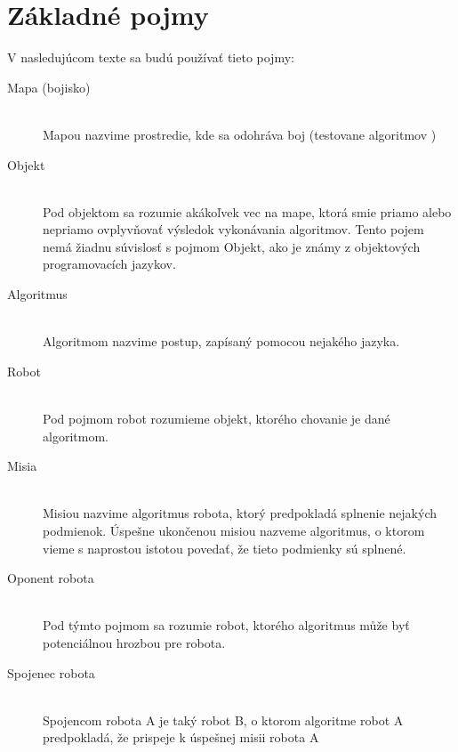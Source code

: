 \section{ Základné pojmy }
V nasledujúcom texte sa budú používať tieto pojmy:
\begin{description}
\item[Mapa (bojisko)]\hfill \\
	Mapou nazvime prostredie, kde sa odohráva boj (testovane algoritmov )
\item[Objekt]\hfill \\
	Pod objektom sa rozumie akákoľvek vec na mape, ktorá smie priamo alebo nepriamo ovplyvňovať výsledok vykonávania algoritmov. Tento pojem nemá žiadnu súvislosť s pojmom Objekt, ako je známy z objektových programovacích jazykov.
\item[Algoritmus]\hfill \\
	Algoritmom nazvime postup, zapísaný pomocou nejakého jazyka. 
\item[Robot]\hfill \\
	Pod pojmom robot rozumieme objekt, ktorého chovanie je dané algoritmom.
\item[Misia]\hfill \\
	Misiou nazvime algoritmus robota, ktorý predpokladá splnenie nejakých podmienok. Úspešne ukončenou misiou nazveme algoritmus, o ktorom vieme s naprostou istotou povedať, že tieto podmienky sú splnené.
\item[Oponent robota]\hfill \\
	Pod týmto pojmom sa rozumie robot, ktorého algoritmus může byť potenciálnou hrozbou pre robota.
\item[Spojenec robota] \hfill \\
	Spojencom robota A je taký robot B, o ktorom algoritme robot A predpokladá, že prispeje k úspešnej misii robota A %
\end{description}

